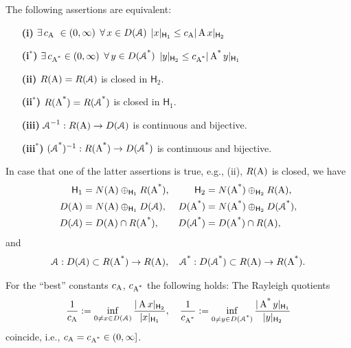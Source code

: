 \documentclass[a4paper]{amsart}
\renewcommand{\H}{\mathsf{H}}
\begin{document}
\begin{lem}
\label{poincarerange}
The following assertions are equivalent:
\begin{itemize}
\item[\bf(i)] 
$\exists\,c_{\operatorname{A}}\,\,\in(0,\infty)$ \quad 
$\forall\,x\in D(\operatorname{\mathcal{A}})$ \qquad
$\norm{x}_{\H_{1}}\leq c_{\A}\norm{\A x}_{\H_{2}}$
\item[\bf(i${}^{*}$)] 
$\exists\,c_{\operatorname{\operatorname{A}^{*}}}\in(0,\infty)$ \quad 
$\forall\,y\in D(\operatorname{\operatorname{\mathcal{A}}^{*}})$ \quad\;
$\norm{y}_{\H_{2}}\leq c_{\As}\norm{\As y}_{\H_{1}}$
\item[\bf(ii)] 
$R(\operatorname{A})=R(\operatorname{\mathcal{A}})$ is closed in $\H_{2}$.
\item[\bf(ii${}^{*}$)] 
$R(\operatorname{\operatorname{A}^{*}})=R(\operatorname{\operatorname{\mathcal{A}}^{*}})$ is closed in $\H_{1}$.
\item[\bf(iii)] 
$\operatorname{\mathcal{A}}^{-1}:R(\operatorname{A})\to D(\operatorname{\mathcal{A}})$ is continuous and bijective.
\item[\bf(iii${}^{*}$)] 
$(\operatorname{\operatorname{\mathcal{A}}^{*}})^{-1}:R(\operatorname{\operatorname{A}^{*}})\to D(\operatorname{\operatorname{\mathcal{A}}^{*}})$ is continuous and bijective.
\end{itemize}
In case that one of the latter assertions is true,
e.g., (ii), $R(\operatorname{A})$ is closed, we have
\begin{align*}
\H_{1}
&=N(\A)\oplus_{\H_{1}}R(\As),
&
\H_{2}
&=N(\As)\oplus_{\H_{2}}R(\A),\\
D(\A)
&=N(\A)\oplus_{\H_{1}}D(\cA),
&
D(\As)
&=N(\As)\oplus_{\H_{2}}D(\cAs),\\
D(\cA)
&=D(\A)\cap R(\As),
&
D(\cAs)
&=D(\As)\cap R(\A),
\end{align*}
and 
\begin{align*}
\operatorname{\mathcal{A}}:D(\operatorname{\mathcal{A}})\subset R(\operatorname{\operatorname{A}^{*}})\to R(\operatorname{A}),\quad
\operatorname{\operatorname{\mathcal{A}}^{*}}:D(\operatorname{\operatorname{\mathcal{A}}^{*}})\subset R(\operatorname{A})\to R(\operatorname{\operatorname{A}^{*}}).
\end{align*}
\end{lem}

\begin{rem}
\label{remconstants}
For the ``best'' constants $c_{\operatorname{A}}$, $c_{\operatorname{\operatorname{A}^{*}}}$ the following holds:
The Rayleigh quotients 
$$\frac{1}{c_{\A}}
:=\inf_{0\neq x\in D(\cA)}\frac{\norm{\A x}_{\H_{2}}}{\norm{x}_{\H_{1}}},\quad
\frac{1}{c_{\As}}
:=\inf_{0\neq y\in D(\cAs)}\frac{\norm{\As y}_{\H_{1}}}{\norm{y}_{\H_{2}}}$$
coincide, i.e., $c_{\operatorname{A}}=c_{\operatorname{\operatorname{A}^{*}}}\in(0,\infty]$.
\end{rem}
\end{document}
